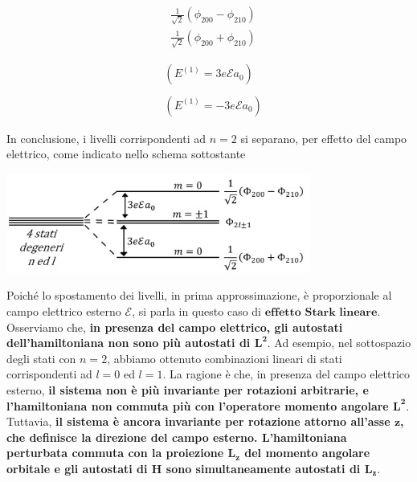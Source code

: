 \documentclass[a4paper,12pt,oneside]{book}
\begin{document}
\begin{center}
\begin{minipage}[c]{0.40\textwidth}
\centering
\begin{equation} \nonumber
\begin{split}
& \frac{1}{\sqrt{2}} \left( \phi_{200}-\phi_{210} \right) \\
& \frac{1}{\sqrt{2}} \left( \phi_{200}+\phi_{210} \right)
\end{split}
\end{equation}
\end{minipage}
\begin{minipage}{0.50\textwidth}
\centering
\begin{equation} 
\begin{split}
& \left( E^{(1)}=3e\mathcal{E}a_0 \right) \\
& \\
& \left( E^{(1)}=-3e\mathcal{E}a_0 \right)
\end{split}
\end{equation}
\end{minipage}
\end{center}
In conclusione, i livelli corrispondenti ad $n=2$ si separano, per effetto del campo elettrico, come indicato nello schema sottostante
\begin{center}
\includegraphics[width=10cm]{immagini/cap_23/fig23_1.png}
\end{center}
Poiché lo spostamento dei livelli, in prima approssimazione, è proporzionale al campo elettrico esterno $\mathcal{E}$, si parla in questo caso di $\textbf{effetto Stark lineare}$.\\
Osserviamo che, \textbf{in presenza del campo elettrico, gli autostati dell'hamiltoniana non sono più autostati di $\boldsymbol{L^2}$}. Ad esempio, nel sottospazio degli stati con $n=2$, abbiamo ottenuto combinazioni lineari di stati corrispondenti ad $l=0$ ed $l=1$. La ragione è che, in presenza del campo elettrico esterno, \textbf{il sistema non è più invariante per rotazioni arbitrarie, e l'hamiltoniana non commuta più con l'operatore momento angolare $\boldsymbol{L^2}$}.\\
Tuttavia, \textbf{il sistema è ancora invariante per rotazione attorno all'asse $\boldsymbol{z}$, che definisce la direzione del campo esterno. L'hamiltoniana perturbata commuta con la proiezione $\boldsymbol{L_z}$ del momento angolare orbitale e gli autostati di $\boldsymbol{H}$ sono simultaneamente autostati di $\boldsymbol{L_z}$}.
\end{document}
